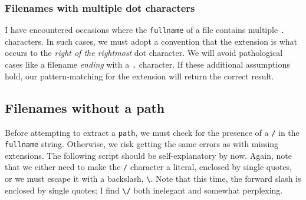 \documentclass[
  a4paper,
]{article}
\newenvironment{Shaded}{\begin{snugshade}}{\end{snugshade}}
\newcommand{\AttributeTok}[1]{\textcolor[rgb]{0.80,0.80,0.80}{#1}}
\newcommand{\BuiltInTok}[1]{\textcolor[rgb]{0.80,0.80,0.80}{#1}}
\newcommand{\CommentTok}[1]{\textcolor[rgb]{0.50,0.62,0.50}{#1}}
\newcommand{\ControlFlowTok}[1]{\textcolor[rgb]{0.94,0.87,0.69}{#1}}
\newcommand{\KeywordTok}[1]{\textcolor[rgb]{0.94,0.87,0.69}{#1}}
\newcommand{\NormalTok}[1]{\textcolor[rgb]{0.80,0.80,0.80}{#1}}
\newcommand{\OperatorTok}[1]{\textcolor[rgb]{0.94,0.94,0.82}{#1}}
\newcommand{\OtherTok}[1]{\textcolor[rgb]{0.94,0.94,0.56}{#1}}
\newcommand{\PreprocessorTok}[1]{\textcolor[rgb]{1.00,0.81,0.69}{\textbf{#1}}}
\newcommand{\StringTok}[1]{\textcolor[rgb]{0.80,0.58,0.58}{#1}}
\newcommand{\VariableTok}[1]{\textcolor[rgb]{0.80,0.80,0.80}{#1}}
\begin{document}
\hypertarget{filenames-with-multiple-dot-characters}{%
\subsubsection{Filenames with multiple dot
characters}\label{filenames-with-multiple-dot-characters}}

I have encountered occasions where the \texttt{fullname} of a file
contains multiple \texttt{.} characters. In such cases, we must adopt a
convention that the extension is what occurs to the \emph{right of the
rightmost} dot character. We will avoid pathological cases like a
filename \emph{ending} with a \texttt{.} character. If these additional
assumptions hold, our pattern-matching for the extension will return the
correct result.

\hypertarget{filenames-without-a-path}{%
\subsection{Filenames without a path}\label{filenames-without-a-path}}

Before attempting to extract a \texttt{path}, we must check for the
presence of a \texttt{/} in the \texttt{fullname} string. Otherwise, we
risk getting the same errors as with missing extensions. The following
script should be self-explanatory by now. Again, note that we either
need to make the \texttt{/} character a literal, enclosed by single
quotes, or we must escape it with a backslash,
\texttt{\textbackslash{}}. Note that this time, the forward slash is
enclosed by single quotes; I find \texttt{\textbackslash{}/} both
inelegant and somewhat perplexing.

\begin{Shaded}
\end{Shaded}
\end{document}
